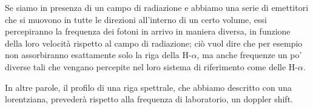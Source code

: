 Se siamo in presenza di un campo di radiazione e abbiamo una serie di emettitori che si muovono in tutte le direzioni all'interno di un certo volume, essi percepiranno la frequenza dei fotoni in arrivo in maniera diversa, in funzione della loro velocità rispetto al campo di radiazione; ciò vuol dire che per esempio non assorbiranno esattamente solo la riga della H-$\alpha$, ma anche frequenze un po' diverse tali che vengano percepite nel loro sistema di riferimento come delle H-$\alpha$.

In altre parole, il profilo di una riga spettrale, che abbiamo descritto con una lorentziana, prevederà rispetto alla frequenza di laboratorio, un doppler shift.






